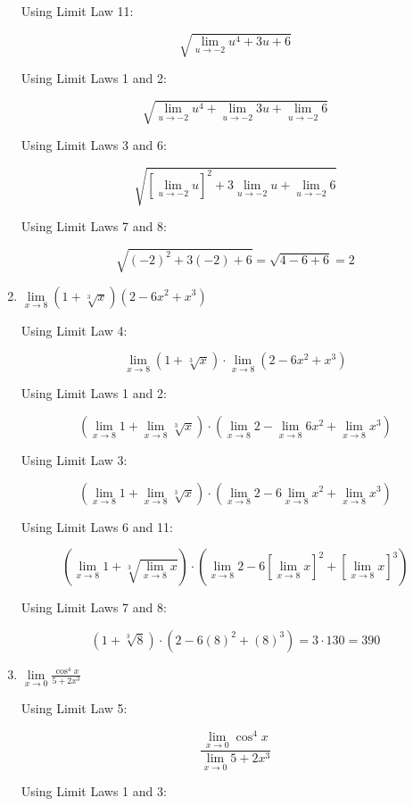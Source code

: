 \documentclass{article}
\begin{document}
\begin{enumerate}
			Using Limit Law 11:
			
			$$\sqrt{\lim \limits _{u \to -2} u^4 + 3u +6}$$
			
			Using Limit Laws 1 and 2:
			
			$$\sqrt{\lim \limits _{u \to -2} u^4 + \lim \limits _{u \to -2} 3u + \lim \limits _{u \to -2} 6}$$
			
			Using Limit Laws 3 and 6:
			
			$$\sqrt{[\lim \limits _{u \to -2} u]^2 + 3 \lim \limits _{u \to -2} u + \lim \limits _{u \to -2} 6}$$
			
			Using Limit Laws 7 and 8:
			
			$$\sqrt{(-2) ^2 + 3(-2) + 6} = \sqrt{4 - 6 + 6} = 2$$
			
		\item $\lim \limits _{x \to 8} ( 1 + \sqrt[3]{x})(2 - 6x^2 + x^3)$
		
		Using Limit Law 4:
		
			$$\lim \limits _{x \to 8} (1 + \sqrt[3]{x}) \cdot \lim \limits _{x \to 8} (2 -6x^2 + x^3)$$
			
		Using Limit Laws 1 and 2:
		
			$$(\lim \limits _{x \to 8} 1 + \lim \limits _{x \to 8} \sqrt[3]{x}) \cdot 
				(\lim \limits _{x \to 8} 2 - \lim \limits _{x \to 8} 6x^2 + \lim\limits _{x \to 8} x^3)$$
				
		Using Limit Law 3:
				
			$$(\lim \limits _{x \to 8} 1 + \lim \limits _{x \to 8} \sqrt[3]{x}) \cdot 
				(\lim \limits _{x \to 8} 2 - 6 \lim \limits _{x \to 8} x^2 + \lim\limits _{x \to 8} x^3)$$
				
		Using Limit Laws 6 and 11:
		
			$$(\lim \limits _{x \to 8} 1 +  \sqrt[3]{\lim \limits _{x \to 8} x}) \cdot 
				(\lim \limits _{x \to 8} 2 - 6 [\lim \limits _{x \to 8} x]^2 + [\lim\limits _{x \to 8} x]^3)$$
				
		Using Limit Laws 7 and 8:
		
			$$( 1 +  \sqrt[3]{8}) \cdot 
				( 2 - 6(8)^2 + (8)^3) = 3 \cdot 130 = 390$$		
				
		\item $\lim \limits _{x \to 0} \frac{\cos ^4 x}{5 + 2x^3}$
		
			Using Limit Law 5:
			
			$$\frac{\lim \limits _{x \to 0} \cos ^4 x}{\lim \limits _{x \to 0} 5 + 2x^3}$$
			
			Using Limit Laws 1 and 3:
			

\end{enumerate}
\end{document}

